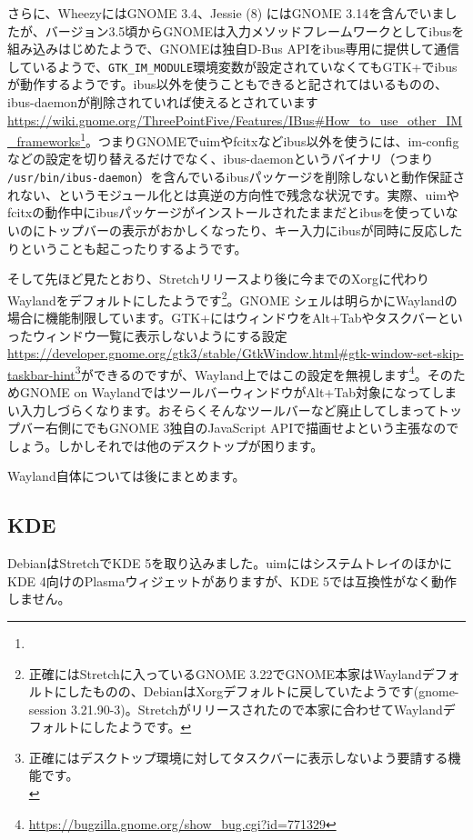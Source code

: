 \documentclass[mingoth,a4paper]{jsarticle}
\begin{document}
さらに、WheezyにはGNOME 3.4、Jessie (8) にはGNOME 3.14を含んでいましたが、バージョン3.5頃からGNOMEは入力メソッドフレームワークとしてibusを組み込みはじめたようで、GNOMEは独自D-Bus APIをibus専用に提供して通信しているようで、\verb|GTK_IM_MODULE|環境変数が設定されていなくてもGTK+でibusが動作するようです。ibus以外を使うこともできると記されてはいるものの、ibus-daemonが削除されていれば使えるとされています\urldef{\gnomeibusurl}\url{https://wiki.gnome.org/ThreePointFive/Features/IBus#How_to_use_other_IM_frameworks}\footnote{\gnomeibusurl}。つまりGNOMEでuimやfcitxなどibus以外を使うには、im-configなどの設定を切り替えるだけでなく、ibus-daemonというバイナリ（つまり \verb|/usr/bin/ibus-daemon|）を含んでいるibusパッケージを削除しないと動作保証されない、というモジュール化とは真逆の方向性で残念な状況です。実際、uimやfcitxの動作中にibusパッケージがインストールされたままだとibusを使っていないのにトップバーの表示がおかしくなったり、キー入力にibusが同時に反応したりということも起こったりするようです。

そして先ほど見たとおり、Stretchリリースより後に今までのXorgに代わりWaylandをデフォルトにしたようです\footnote{正確にはStretchに入っているGNOME 3.22でGNOME本家はWaylandデフォルトにしたものの、DebianはXorgデフォルトに戻していたようです(gnome-session 3.21.90-3)。Stretchがリリースされたので本家に合わせてWaylandデフォルトにしたようです。}。GNOME シェルは明らかにWaylandの場合に機能制限しています。GTK+にはウィンドウをAlt+Tabやタスクバーといったウィンドウ一覧に表示しないようにする設定\urldef{\gtktaskbarurl}\url{https://developer.gnome.org/gtk3/stable/GtkWindow.html#gtk-window-set-skip-taskbar-hint}\footnote{正確にはデスクトップ環境に対してタスクバーに表示しないよう要請する機能です。\\
\gtktaskbarurl}ができるのですが、Wayland上ではこの設定を無視します\footnote{\url{https://bugzilla.gnome.org/show_bug.cgi?id=771329}}。そのためGNOME on WaylandではツールバーウィンドウがAlt+Tab対象になってしまい入力しづらくなります。おそらくそんなツールバーなど廃止してしまってトップバー右側にでもGNOME 3独自のJavaScript APIで描画せよという主張なのでしょう。しかしそれでは他のデスクトップが困ります。

Wayland自体については後にまとめます。

\subsection{KDE}
DebianはStretchでKDE 5を取り込みました。uimにはシステムトレイのほかにKDE 4向けのPlasmaウィジェットがありますが、KDE 5では互換性がなく動作しません。
\end{document}
